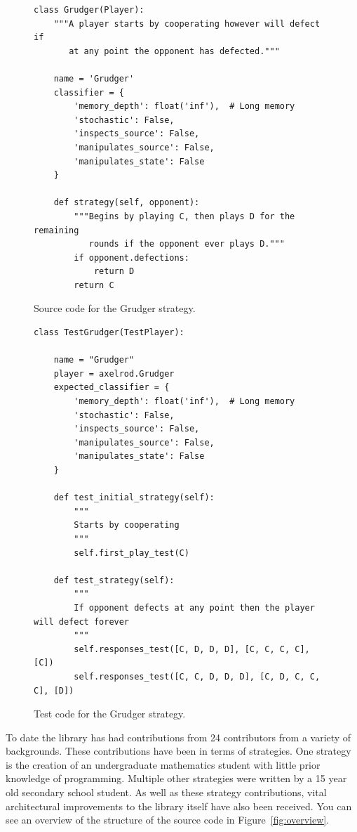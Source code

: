 \documentclass{article}
\begin{document}
\begin{figure}[!hbtp]
    \begin{verbatim}
class Grudger(Player):
    """A player starts by cooperating however will defect if
       at any point the opponent has defected."""

    name = 'Grudger'
    classifier = {
        'memory_depth': float('inf'),  # Long memory
        'stochastic': False,
        'inspects_source': False,
        'manipulates_source': False,
        'manipulates_state': False
    }

    def strategy(self, opponent):
        """Begins by playing C, then plays D for the remaining
           rounds if the opponent ever plays D."""
        if opponent.defections:
            return D
        return C
    \end{verbatim}
    \caption{Source code for the Grudger strategy.}
    \label{fig:grudger}
\end{figure}



\begin{figure}[!hbtp]
    \begin{verbatim}
class TestGrudger(TestPlayer):

    name = "Grudger"
    player = axelrod.Grudger
    expected_classifier = {
        'memory_depth': float('inf'),  # Long memory
        'stochastic': False,
        'inspects_source': False,
        'manipulates_source': False,
        'manipulates_state': False
    }

    def test_initial_strategy(self):
        """
        Starts by cooperating
        """
        self.first_play_test(C)

    def test_strategy(self):
        """
        If opponent defects at any point then the player will defect forever
        """
        self.responses_test([C, D, D, D], [C, C, C, C], [C])
        self.responses_test([C, C, D, D, D], [C, D, C, C, C], [D])
    \end{verbatim}
    \caption{Test code for the Grudger strategy.}
    \label{fig:grudger_test}
\end{figure}

To date the library has had contributions from 24 contributors from a variety of
backgrounds. These contributions have been in terms of strategies. One strategy
is the creation of an undergraduate mathematics student with little prior
knowledge of programming. Multiple other strategies were written by a 15 year old
secondary school student. As well as these strategy contributions, vital
architectural improvements to the library itself have also been received. You
can see an overview of the structure of the source code in
Figure~\ref{fig:overview}.
\end{document}
